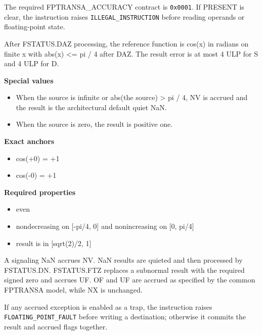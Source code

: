 The required FPTRANSA\_ACCURACY contract is \texttt{0x0001}. If PRESENT is clear, the instruction raises \texttt{ILLEGAL\_INSTRUCTION} before reading operands or floating-point state.

After FSTATUS.DAZ processing, the reference function is cos(x) in radians on finite x with abs(x) \textless{}= pi / 4 after DAZ. The result error is at most 4 ULP for S and 4 ULP for D.

\textbf{Special values}\par
\begin{itemize}
\item When the source is infinite or abs(the source) \textgreater{} pi / 4, NV is accrued and the result is the architectural default quiet NaN.
\item When the source is zero, the result is positive one.
\end{itemize}

\textbf{Exact anchors}\par
\begin{itemize}
\item cos(+0) = +1
\item cos(-0) = +1
\end{itemize}

\textbf{Required properties}\par
\begin{itemize}
\item even
\item nondecreasing on [-pi/4, 0] and nonincreasing on [0, pi/4]
\item result is in [sqrt(2)/2, 1]
\end{itemize}

A signaling NaN accrues NV. NaN results are quieted and then processed by FSTATUS.DN. FSTATUS.FTZ replaces a subnormal result with the required signed zero and accrues UF. OF and UF are accrued as specified by the common FPTRANSA model, while NX is unchanged.

If any accrued exception is enabled as a trap, the instruction raises \texttt{FLOATING\_POINT\_FAULT} before writing a destination; otherwise it commits the result and accrued flags together.
